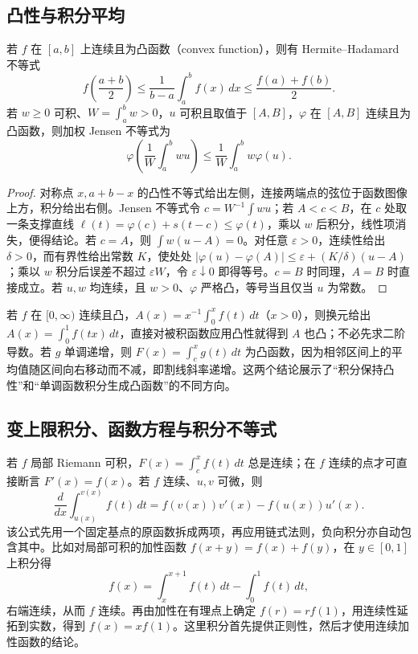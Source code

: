 \subsection{凸性与积分平均}
\begin{theorem}
\label{thm:pei-int-hadamard-jensen}
若 $f$ 在 $[a,b]$ 上连续且为凸函数（convex function），则有 Hermite--Hadamard 不等式
\[
 f\left(\frac{a+b}{2}\right)\le\frac1{b-a}\int_a^bf(x)\,dx\le\frac{f(a)+f(b)}2.
\]
若 $w\ge0$ 可积、$W=\int_a^bw>0$，$u$ 可积且取值于 $[A,B]$，$\varphi$ 在 $[A,B]$ 连续且为凸函数，则加权 Jensen 不等式为
\begin{equation}
 \varphi\left(\frac1W\int_a^bwu\right)\le\frac1W\int_a^bw\varphi(u).
 \label{eq:pei-int-jensen}
\end{equation}
\end{theorem}
\begin{proof}
对称点 $x,a+b-x$ 的凸性不等式给出左侧，连接两端点的弦位于函数图像上方，积分给出右侧。Jensen 不等式令 $c=W^{-1}\int wu$；若 $A<c<B$，在 $c$ 处取一条支撑直线 $\ell(t)=\varphi(c)+s(t-c)\le\varphi(t)$，乘以 $w$ 后积分，线性项消失，便得结论。若 $c=A$，则 $\int w(u-A)=0$。对任意 $\varepsilon>0$，连续性给出 $\delta>0$，而有界性给出常数 $K$，使处处 $|\varphi(u)-\varphi(A)|\le\varepsilon+(K/\delta)(u-A)$；乘以 $w$ 积分后误差不超过 $\varepsilon W$，令 $\varepsilon\downarrow0$ 即得等号。$c=B$ 时同理，$A=B$ 时直接成立。若 $u,w$ 均连续，且 $w>0$、$\varphi$ 严格凸，等号当且仅当 $u$ 为常数。
\end{proof}
若 $f$ 在 $[0,\infty)$ 连续且凸，$A(x)=x^{-1}\int_0^xf(t)\,dt$（$x>0$），则换元给出 $A(x)=\int_0^1f(tx)\,dt$，直接对被积函数应用凸性就得到 $A$ 也凸；不必先求二阶导数。若 $g$ 单调递增，则 $F(x)=\int_c^xg(t)\,dt$ 为凸函数，因为相邻区间上的平均值随区间向右移动而不减，即割线斜率递增。这两个结论展示了“积分保持凸性”和“单调函数积分生成凸函数”的不同方向。

\subsection{变上限积分、函数方程与积分不等式}
若 $f$ 局部 Riemann 可积，$F(x)=\int_c^xf(t)\,dt$ 总是连续；在 $f$ 连续的点才可直接断言 $F'(x)=f(x)$。若 $f$ 连续、$u,v$ 可微，则
\[
 \frac{d}{dx}\int_{u(x)}^{v(x)}f(t)\,dt=f(v(x))v'(x)-f(u(x))u'(x).
\]
该公式先用一个固定基点的原函数拆成两项，再应用链式法则，负向积分亦自动包含其中。比如对局部可积的加性函数 $f(x+y)=f(x)+f(y)$，在 $y\in[0,1]$ 上积分得
\[
 f(x)=\int_x^{x+1}f(t)\,dt-\int_0^1f(t)\,dt,
\]
右端连续，从而 $f$ 连续。再由加性在有理点上确定 $f(r)=rf(1)$，用连续性延拓到实数，得到 $f(x)=xf(1)$。这里积分首先提供正则性，然后才使用连续加性函数的结论。

